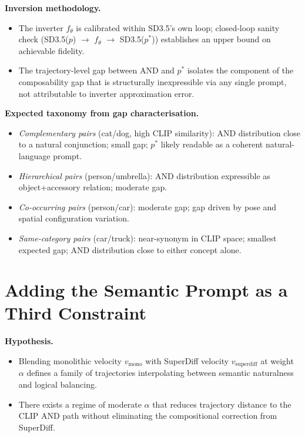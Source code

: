 \documentclass[runningheads]{llncs}
\begin{document}
\textbf{Inversion methodology.}
\begin{itemize}
  \item The inverter $f_\theta$ is calibrated within SD3.5's own loop;
    closed-loop sanity check (SD3.5($p$) $\to$ $f_\theta$ $\to$
    SD3.5($p^*$)) establishes an upper bound on achievable fidelity.
  \item The trajectory-level gap between AND and $p^*$ isolates the
    component of the composability gap that is structurally
    inexpressible via any single prompt, not attributable to inverter
    approximation error.
\end{itemize}

\textbf{Expected taxonomy from gap characterisation.}
\begin{itemize}
  \item \emph{Complementary pairs} (cat/dog, high CLIP similarity): AND
    distribution close to a natural conjunction; small gap; $p^*$ likely
    readable as a coherent natural-language prompt.
  \item \emph{Hierarchical pairs} (person/umbrella): AND distribution
    expressible as object+accessory relation; moderate gap.
  \item \emph{Co-occurring pairs} (person/car): moderate gap; gap driven
    by pose and spatial configuration variation.
  \item \emph{Same-category pairs} (car/truck): near-synonym in CLIP space;
    smallest expected gap; AND distribution close to either concept alone.
\end{itemize}

\section{Adding the Semantic Prompt as a Third Constraint}

\textbf{Hypothesis.}
\begin{itemize}
  \item Blending monolithic velocity $v_{\text{mono}}$ with SuperDiff
    velocity $v_{\text{superdiff}}$ at weight $\alpha$ defines a family
    of trajectories interpolating between semantic naturalness and logical
    balancing.
  \item There exists a regime of moderate $\alpha$ that reduces trajectory
    distance to the CLIP AND path without eliminating the compositional
    correction from SuperDiff.
\end{itemize}
\end{document}
